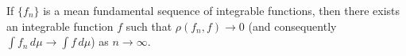 If $\{f_n\}$ is a mean fundamental sequence of integrable functions, then there exists an integrable function $f$ such that $\rho(f_n, f) \to 0$ (and consequently $\int f_n \, d\mu \to \int f \, d\mu$) as $n \to \infty$.
